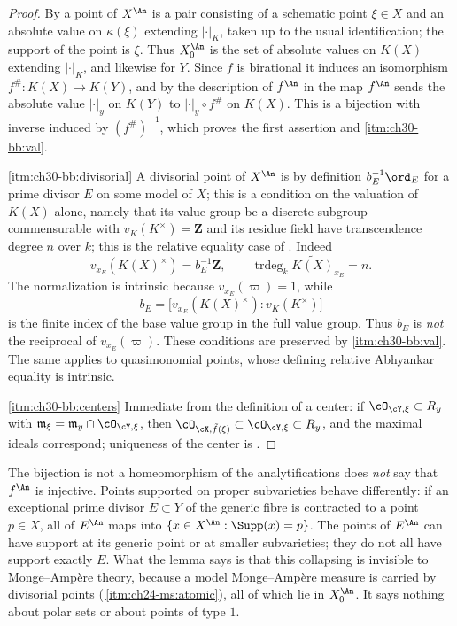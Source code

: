 \begin{proof}
By  a point of $X^{\An}$ is a pair
consisting of a schematic point $\xi\in X$ and an absolute value on
$\kappa(\xi)$ extending $|\cdot|_K$, taken up to the usual
identification; the support of the point is $\xi$.  Thus $X^{\An}_0$ is
the set of absolute values on $K(X)$ extending $|\cdot|_K$, and
likewise for $Y$.  Since $f$ is birational it induces an isomorphism
$f^\#:K(X)\to K(Y)$, and by the description of $f^{\An}$ in
 the map $f^{\An}$ sends the absolute value
$|\cdot|_y$ on $K(Y)$ to $|\cdot|_y\circ f^\#$ on $K(X)$.  This is a
bijection with inverse induced by $(f^\#)^{-1}$, which proves the first
assertion and \cref{itm:ch30-bb:val}.

\cref{itm:ch30-bb:divisorial}  A divisorial point of $X^{\An}$ is by
definition $b_E^{-1}\ord_E$ for a prime divisor $E$ on some model of
$X$; this is a condition on the valuation of $K(X)$ alone, namely that
its value group be a discrete subgroup commensurable with
$v_K(K^\times)=\mathbf Z$ and its residue field have transcendence degree
$n$ over $k$; this is the relative equality case of
.  Indeed
\[
 v_{x_E}(K(X)^\times)=b_E^{-1}\mathbf Z,
 \qquad
 \operatorname{trdeg}_k\widetilde{K(X)}_{x_E}=n.
\]
The normalization is intrinsic because $v_{x_E}(\varpi)=1$, while
\[
 b_E=
 \bigl[v_{x_E}(K(X)^\times):v_K(K^\times)\bigr]
\]
is the finite index of the base value group in the full value group.  Thus
$b_E$ is \emph{not} the reciprocal of $v_{x_E}(\varpi)$.  These
conditions are preserved by \cref{itm:ch30-bb:val}.  The same applies to
quasimonomial points, whose defining relative Abhyankar equality is
intrinsic.

\cref{itm:ch30-bb:centers}  Immediate from the definition of a center: if
$\cO_{\cY,\xi}\subset R_y$ with $\mathfrak m_\xi=\mathfrak m_y\cap
\cO_{\cY,\xi}$, then $\cO_{\cX,\tilde f(\xi)}\subset\cO_{\cY,\xi}\subset
R_y$, and the maximal ideals correspond; uniqueness of the center is
.
\end{proof}

\begin{warning}{The bijection is not a homeomorphism of the analytifications}
 does \emph{not} say that $f^{\An}$ is
injective.  Points supported on proper subvarieties behave differently:
if an exceptional prime divisor $E\subset Y$ of the generic fibre is
contracted to a point $p\in X$, all of $E^{\An}$ maps into
$\{x\in X^{\An}:\Supp(x)=p\}$.  The points of $E^{\An}$ can
have support at its generic point or at smaller subvarieties; they do
not all have support exactly $E$.  What the
lemma says is that this collapsing is invisible to Monge--Amp\`ere theory,
because a model Monge--Amp\`ere measure is carried by divisorial points
(\,\cref{itm:ch24-ms:atomic}), all of which lie
in $X^{\An}_0$.  It says nothing about polar sets or about points of type
$1$.
\end{warning}

